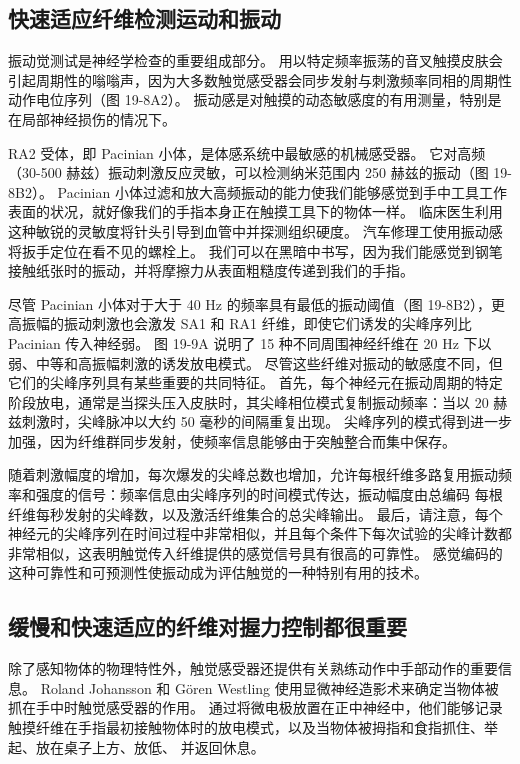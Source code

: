 \subsection{快速适应纤维检测运动和振动}
振动觉测试是神经学检查的重要组成部分。 用以特定频率振荡的音叉触摸皮肤会引起周期性的嗡嗡声，因为大多数触觉感受器会同步发射与刺激频率同相的周期性动作电位序列（图 19-8A2）。 振动感是对触摸的动态敏感度的有用测量，特别是在局部神经损伤的情况下。

RA2 受体，即 Pacinian 小体，是体感系统中最敏感的机械感受器。 它对高频（30-500 赫兹）振动刺激反应灵敏，可以检测纳米范围内 250 赫兹的振动（图 19-8B2）。 Pacinian 小体过滤和放大高频振动的能力使我们能够感觉到手中工具工作表面的状况，就好像我们的手指本身正在触摸工具下的物体一样。 临床医生利用这种敏锐的灵敏度将针头引导到血管中并探测组织硬度。 汽车修理工使用振动感将扳手定位在看不见的螺栓上。 我们可以在黑暗中书写，因为我们能感觉到钢笔接触纸张时的振动，并将摩擦力从表面粗糙度传递到我们的手指。

尽管 Pacinian 小体对于大于 40 Hz 的频率具有最低的振动阈值（图 19-8B2），更高振幅的振动刺激也会激发 SA1 和 RA1 纤维，即使它们诱发的尖峰序列比 Pacinian 传入神经弱。 图 19-9A 说明了 15 种不同周围神经纤维在 20 Hz 下以弱、中等和高振幅刺激的诱发放电模式。 尽管这些纤维对振动的敏感度不同，但它们的尖峰序列具有某些重要的共同特征。 首先，每个神经元在振动周期的特定阶段放电，通常是当探头压入皮肤时，其尖峰相位模式复制振动频率：当以 20 赫兹刺激时，尖峰脉冲以大约 50 毫秒的间隔重复出现。 尖峰序列的模式得到进一步加强，因为纤维群同步发射，使频率信息能够由于突触整合而集中保存。

随着刺激幅度的增加，每次爆发的尖峰总数也增加，允许每根纤维多路复用振动频率和强度的信号：频率信息由尖峰序列的时间模式传达，振动幅度由总编码 每根纤维每秒发射的尖峰数，以及激活纤维集合的总尖峰输出。 最后，请注意，每个神经元的尖峰序列在时间过程中非常相似，并且每个条件下每次试验的尖峰计数都非常相似，这表明触觉传入纤维提供的感觉信号具有很高的可靠性。 感觉编码的这种可靠性和可预测性使振动成为评估触觉的一种特别有用的技术。

\subsection{缓慢和快速适应的纤维对握力控制都很重要}
除了感知物体的物理特性外，触觉感受器还提供有关熟练动作中手部动作的重要信息。 Roland Johansson 和 Gören Westling 使用显微神经造影术来确定当物体被抓在手中时触觉感受器的作用。 通过将微电极放置在正中神经中，他们能够记录触摸纤维在手指最初接触物体时的放电模式，以及当物体被拇指和食指抓住、举起、放在桌子上方、放低、 并返回休息。

